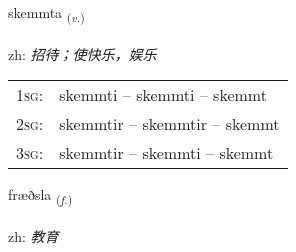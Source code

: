 \documentclass[frontgrid, backgrid]{flacards}\usepackage[]{graphicx}\usepackage[]{color}
\begin{document}
\renewcommand{\blhead}{\vskip5pt {\small\bfseries\footnotesize Sagnorð | 动词 }}
\renewcommand{\bcfoot}{\vskip5pt \hspace{2pt}{\small\bfseries\footnotesize 2K}}


{skemmta \small{\textsubscript{(\textit{v.})}} \\[1ex] %
\textphonetic{[scɛm̥ta]} \\
zh: \emph{招待；使快乐，娱乐} \\  [2ex]
\renewcommand*{\arraystretch}{0.8}
\begin{tabular}{p{1cm}l}
\textsc{1sg}: & skemmti -- skemmti -- skemmt \\ 
\textsc{2sg}: & skemmtir -- skemmtir -- skemmt \\ 
\textsc{3sg}: & skemmtir -- skemmti -- skemmt \\ 
\end{tabular}
}

\renewcommand{\flhead}{\vskip5pt \fboxsep=0pt {\small\bfseries\footnotesize Nafnorð | 名词}}
\renewcommand{\fcfoot}{\vskip5pt \fboxsep=0pt \hspace{2pt}{\small\bfseries\footnotesize 2K}}

\renewcommand{\blhead}{\vskip5pt {\small\bfseries\footnotesize Nafnorð | 名词 }}
\renewcommand{\bcfoot}{\vskip5pt \hspace{2pt}{\small\bfseries\footnotesize 2K}}


{fræðsla \small{\textsubscript{(\textit{f.})}} \\[1ex] %
\textphonetic{[fraiðstla]} \\
zh: \emph{教育} \\  [2ex]
\renewcommand*{\arraystretch}{0.8}
}

\renewcommand{\flhead}{\vskip5pt \fboxsep=0pt {\small\bfseries\footnotesize Atviksorð | 副词}}
\renewcommand{\fcfoot}{\vskip5pt \fboxsep=0pt \hspace{2pt}{\small\bfseries\footnotesize 2K}}
\end{document}
